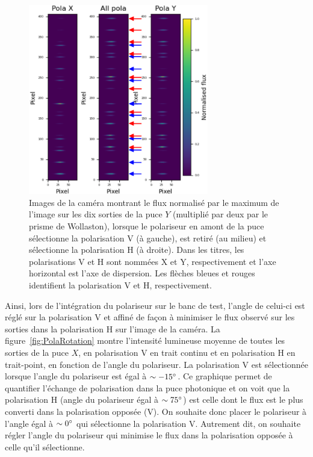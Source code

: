 \begin{figure}[ht!]
    \centering
    \includegraphics[width=0.7\textwidth]{Figure_Chap2/20210707_PolaComparison_PolId.png}
    \caption[Images de la caméra montrant le flux sur les dix sorties de la puce $Y$ dans les deux polarisations.]{Images de la caméra montrant le flux normalisé par le maximum de l'image sur les dix sorties de la puce $Y$ (multiplié par deux par le prisme de Wollaston), lorsque le polariseur en amont de la puce sélectionne la polarisation V (à gauche), est retiré (au milieu) et sélectionne la polarisation H (à droite). Dans les titres, les polarisations V et H sont nommées X et Y, respectivement et l'axe horizontal est l'axe de dispersion. Les flèches bleues et rouges identifient la polarisation V et H, respectivement.}
    \label{fig:PolaComparison}
\end{figure}

Ainsi, lors de l'intégration du polariseur sur le banc de test, l'angle de celui-ci est réglé sur la polarisation V et affiné de façon à minimiser le flux observé sur les sorties dans la polarisation H sur l'image de la caméra. La figure~\ref{fig:PolaRotation} montre l'intensité lumineuse moyenne de toutes les sorties de la puce $X$, en polarisation V en trait continu et en polarisation H en trait-point, en fonction de l'angle du polariseur. La polarisation V est sélectionnée lorsque l'angle du polariseur est égal à $\sim -15^{\circ}$. Ce graphique permet de quantifier l'échange de polarisation dans la puce photonique et on voit que la polarisation H (angle du polariseur égal à $\sim 75^{\circ}$) est celle dont le flux est le plus converti dans la polarisation opposée (V). On souhaite donc placer le polariseur à l'angle égal à $\sim 0^{\circ}$ qui sélectionne la polarisation V. Autrement dit, on souhaite régler l'angle du polariseur qui minimise le flux dans la polarisation opposée à celle qu'il sélectionne.

